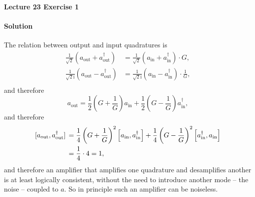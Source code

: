 \documentclass[hyperref, a4paper]{article}
\newcommand*{\ii}{\mathrm{i}}
\begin{document}
\paragraph{Lecture 23 Exercise 1} 

\paragraph{Solution} The relation between output and input quadratures is 
\begin{equation}
    \begin{aligned}
        \frac{1}{\sqrt{2}} (a_{\text{out}} + a^\dagger_{\text{out}}) 
        &= \frac{1}{\sqrt{2}} (a_{\text{in}} + a^\dagger_{\text{in}}) \cdot G, \\
        \frac{1}{\sqrt{2} \ii} (a_{\text{out}} - a^\dagger_{\text{out}}) 
        &= \frac{1}{\sqrt{2} \ii} (a_{\text{in}} - a^\dagger_{\text{in}}) \cdot \frac{1}{G}, \\
    \end{aligned}
\end{equation}
and therefore 
\begin{equation}
    a_{\text{out}} = \frac{1}{2} \left( G + \frac{1}{G} \right) a_{\text{in}}
    + \frac{1}{2} \left( G - \frac{1}{G} \right) a_{\text{in}}^\dagger,
\end{equation}
and therefore 
\begin{equation}
    \begin{aligned}
        \comm*{a_{\text{out}}}{a^\dagger_{\text{out}}} 
        &= \frac{1}{4} \left( G + \frac{1}{G} \right)^2 \comm{a_{\text{in}}}{a^\dagger_{\text{in}}} 
        + \frac{1}{4} \left( G - \frac{1}{G} \right)^2 \comm{a_{\text{in}}^\dagger}{a_{\text{in}}} \\
        &= \frac{1}{4} \cdot 4 = 1,
    \end{aligned}
\end{equation}
and therefore an amplifier that amplifies one quadrature
and desamplifies another is at least logically consistent,
without the need to introduce another mode -- the noise -- coupled to $a$.
So in principle such an amplifier can be noiseless.
\end{document}
